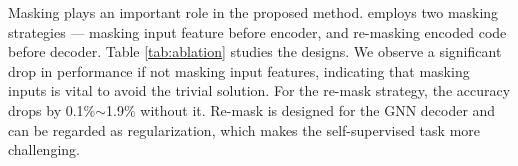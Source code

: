  Masking plays an important role in the proposed \model method. \model employs two masking strategies --- masking input feature before encoder, and re-masking encoded code before decoder. Table \ref{tab:ablation} studies the designs. We observe a significant drop in performance if not masking input features, indicating that masking inputs is vital to avoid  the trivial solution. For the re-mask strategy, the accuracy drops by 0.1\%$\sim$1.9\% without it. 
Re-mask is designed for the GNN decoder and can be regarded as regularization, which makes the self-supervised task more challenging.









